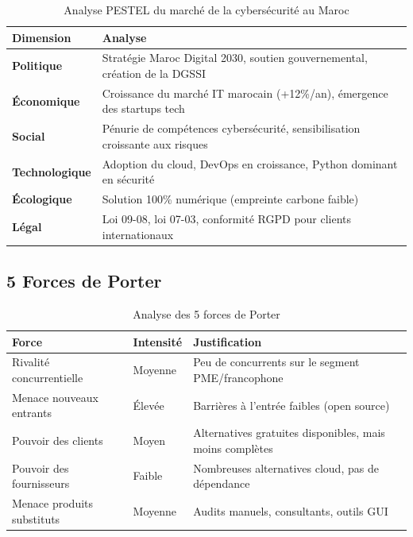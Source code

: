 \documentclass[12pt,a4paper]{report}
\newcommand{\hdr}[1]{\cellcolor{gray!15}\textbf{#1}}
\newcommand{\rowA}{\rowcolor{gray!8}}
\begin{document}
\begin{table}[H]
\centering
\caption{Analyse PESTEL du marché de la cybersécurité au Maroc}
\begin{tabular}{p{3cm}p{9cm}}
\toprule
\hdr{Dimension} & \hdr{Analyse} \\
\midrule
\textbf{Politique} & Stratégie Maroc Digital 2030, soutien gouvernemental, création de la DGSSI \\
\rowA \textbf{Économique} & Croissance du marché IT marocain (+12\%/an), émergence des startups tech \\
\textbf{Social} & Pénurie de compétences cybersécurité, sensibilisation croissante aux risques \\
\rowA \textbf{Technologique} & Adoption du cloud, DevOps en croissance, Python dominant en sécurité \\
\textbf{Écologique} & Solution 100\% numérique (empreinte carbone faible) \\
\rowA \textbf{Légal} & Loi 09-08, loi 07-03, conformité RGPD pour clients internationaux \\
\bottomrule
\end{tabular}
\end{table}

\subsection{5 Forces de Porter}

\begin{table}[H]
\centering
\caption{Analyse des 5 forces de Porter}
\begin{tabular}{p{4cm}p{2cm}p{6cm}}
\toprule
\hdr{Force} & \hdr{Intensité} & \hdr{Justification} \\
\midrule
Rivalité concurrentielle & Moyenne & Peu de concurrents sur le segment PME/francophone \\
\rowA Menace nouveaux entrants & Élevée & Barrières à l'entrée faibles (open source) \\
Pouvoir des clients & Moyen & Alternatives gratuites disponibles, mais moins complètes \\
\rowA Pouvoir des fournisseurs & Faible & Nombreuses alternatives cloud, pas de dépendance \\
Menace produits substituts & Moyenne & Audits manuels, consultants, outils GUI \\
\bottomrule
\end{tabular}
\end{table}
\end{document}
